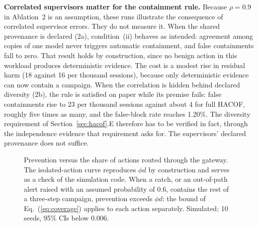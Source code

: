 \documentclass[journal]{IEEEtran}
\newcommand{\hacof}{HACOF}
\begin{document}
\textbf{Correlated supervisors matter for the containment rule.} Because $\rho=0.9$ in Ablation~2 is an assumption, these runs illustrate the consequence of correlated supervisor errors. They do not measure it. When the shared provenance is declared (2a), condition~(ii) behaves as intended: agreement among copies of one model never triggers automatic containment, and false containments fall to zero. That result holds by construction, since no benign action in this workload produces deterministic evidence. The cost is a modest rise in residual harm (18 against 16 per thousand sessions), because only deterministic evidence can now contain a campaign. When the correlation is hidden behind declared diversity (2b), the rule is satisfied on paper while its premise fails: false containments rise to 23 per thousand sessions against about 4 for full \hacof{}, roughly five times as many, and the false-block rate reaches 1.20\%. The diversity requirement of Section~\ref{sec:hacof}.E therefore has to be verified in fact, through the independence evidence that requirement asks for. The supervisors' declared provenance does not suffice.

\begin{figure}[!t]
\centering
{}
\caption{Prevention versus the share of actions routed through the gateway. The isolated-action curve reproduces $\phi d$ by construction and serves as a check of the simulation code. When a catch, or an out-of-path alert raised with an assumed probability of 0.6, contains the rest of a three-step campaign, prevention exceeds $\phi d$: the bound of Eq.~(\ref{eq:coverage}) applies to each action separately. Simulated; 10 seeds, 95\% CIs below 0.006.}
\label{fig:simcoverage}
\end{figure}
\end{document}
